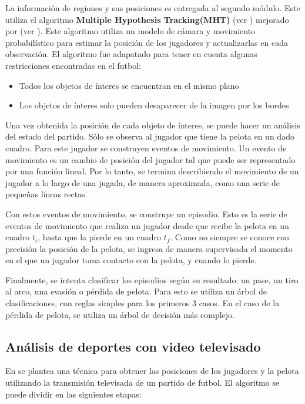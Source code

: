 La información de regiones y sus posiciones es entregada al segundo módulo.
Este utiliza el algoritmo \textbf{Multiple Hypothesis Tracking(MHT)} (ver \cite{MHT-1, MHT-2}) mejorado por
\citeauthor*{Schmitt-1} (ver \cite{Schmitt-2}). Este algoritmo utiliza un modelo de cámara y movimiento
probabilístico para estimar la posición de los jugadores y actualizarlas en cada observación.
El algoritmo fue adapatado para tener en cuenta algunas restricciones encontradas en el futbol:
\begin{itemize}
\item Todos los objetos de ínteres se encuentran en el mismo plano
\item Los objetos de ínteres solo pueden desaparecer de la imagen por los bordes
\end{itemize}

Una vez obtenida la posición de cada objeto de ínteres, se puede hacer un análisis del estado del partido.
Sólo se observa al jugador que tiene la pelota en un dado cuadro.
Para este jugador se construyen eventos de movimiento. Un evento de movimiento es un cambio de posición del jugador
tal que puede ser representado por una función lineal. Por lo tanto, se termina describiendo el movimiento de un
jugador a lo largo de una jugada, de manera aproximada, como una serie de pequeñas líneas rectas.

Con estos eventos de movimiento, se construye un episodio. Esto es la serie de eventos de movimiento que realiza
un jugador desde que recibe la pelota en un cuadro $t_i$, hasta que la pierde en un cuadro $t_f$.
Como no siempre se conoce con precisión la posición de la pelota, se ingresa de manera supervisada el momento en el
que un jugador toma contacto con la pelota, y cuando lo pierde.

Finalmente, se intenta clasificar los episodios según su resultado: un pase, un tiro al arco, una evasión o pérdida de pelota.
Para esto se utiliza un árbol de clasificaciones, con reglas simples para los primeros 3 casos.
En el caso de la pérdida de pelota, se utiliza un árbol de decisión más complejo.

\subsection{Análisis de deportes con video televisado}
\label{sec:tv-video}

En \cite{Liu20061146} se plantea una técnica para obtener las posiciones de los
jugadores y la pelota utilizando la transmisión televisada de un partido de
futbol. El algoritmo se puede dividir en las siguientes etapas:

